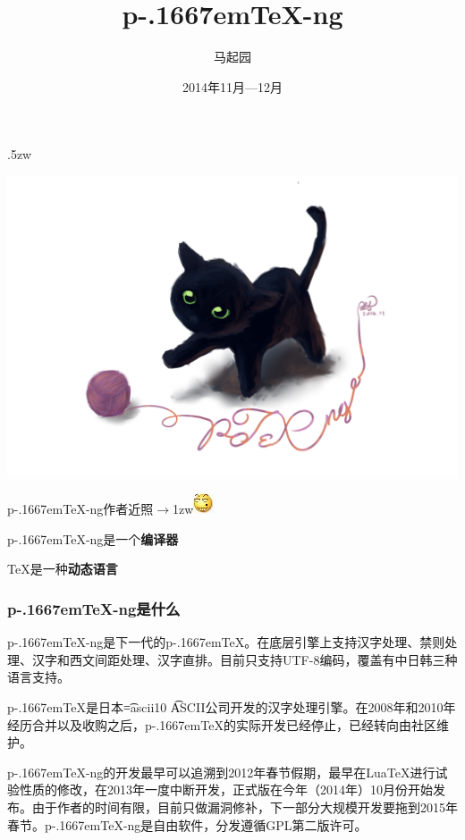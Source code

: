 \documentclass[dvipdfmx]{beamer}
\newcommand{\pTeX}{p\kern-.1667em\TeX}
\newcommand{\ptexng}{\pTeX-ng}
\begin{document}
\title{\bf \ptexng}
\author{马起园}
\date{2014年11月—12月}
\begin{frame}
\maketitle
\end{frame}
%
\parskip.5zw
\begin{frame}[fragile]
\includegraphics[bb=0 0 864 576, width=\textwidth]{doc-ptex-ng-cat.png}
\end{frame}
\begin{frame}[fragile]
\begin{center}
\ptexng 作者近照$\rightarrow$\lower1zw\hbox{\includegraphics[bb=0 0 17 17, width=3zw]{doc-ptex-ng-aut.png}}
\end{center}
\end{frame}
%
\begin{frame}[fragile]
\begin{center}
\Huge \ptexng 是一个{\bf 编译器}

\TeX 是一种{\bf 动态语言}
\end{center}
\end{frame}
%
\begin{frame}[fragile]
\frametitle{\bf \ptexng 是什么}
\ptexng 是下一代的\pTeX。在底层引擎上支持汉字处理、禁则处理、汉字和西文间距处理、汉字直排。目前只支持UTF-8编码，覆盖有中日韩三种语言支持。

\pTeX 是日本{\font\t=ascii10 \t ASCII}公司开发的汉字处理引擎。在2008年和2010年经历合并以及收购之后，\pTeX 的实际开发已经停止，已经转向由社区维护。

\ptexng 的开发最早可以追溯到2012年春节假期，最早在Lua\TeX 进行试验性质的修改，在2013年一度中断开发，正式版在今年（2014年）10月份开始发布。由于作者的时间有限，目前只做漏洞修补，下一部分大规模开发要拖到2015年春节。\ptexng 是自由软件，分发遵循GPL第二版许可。
\end{frame}
\end{document}
